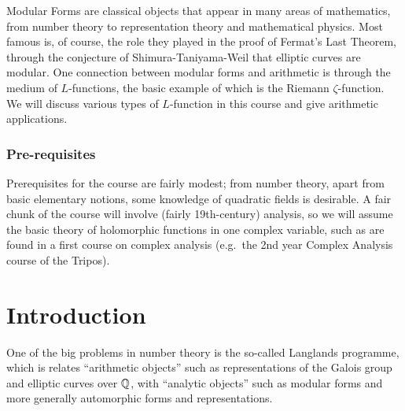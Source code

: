 \documentclass[a4paper]{article}
\begin{document}
\maketitle
{\small
\setlength{\parindent}{0em}
\setlength{\parskip}{1em}
Modular Forms are classical objects that appear in many areas of mathematics, from number theory to representation theory and mathematical physics. Most famous is, of course, the role they played in the proof of Fermat's Last Theorem, through the conjecture of Shimura-Taniyama-Weil that elliptic curves are modular. One connection between modular forms and arithmetic is through the medium of $L$-functions, the basic example of which is the Riemann $\zeta$-function. We will discuss various types of $L$-function in this course and give arithmetic applications.

\subsubsection*{Pre-requisites}
Prerequisites for the course are fairly modest; from number theory, apart from basic elementary notions, some knowledge of quadratic fields is desirable. A fair chunk of the course will involve (fairly 19th-century) analysis, so we will assume the basic theory of holomorphic functions in one complex variable, such as are found in a first course on complex analysis (e.g.\ the 2nd year Complex Analysis course of the Tripos).
}
\tableofcontents

\setcounter{section}{-1}
\section{Introduction}
One of the big problems in number theory is the so-called Langlands programme, which is relates ``arithmetic objects'' such as representations of the Galois group and elliptic curves over $\mathbb{Q}$, with ``analytic objects'' such as modular forms and more generally automorphic forms and representations.
\end{document}
